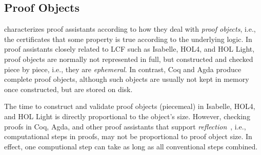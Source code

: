 
\subsection{Proof Objects}
\label{sec:proof-objects}

\citet{Barendregt2013} characterizes proof assistants according to how they deal with \emph{proof objects}, i.e., the certificates that some property is true according to the underlying logic. In proof assistants closely related to LCF such as Isabelle, HOL4, and HOL Light, proof objects are normally not represented in full, but constructed and checked piece by piece, i.e., they are \emph{ephemeral}. In contrast, Coq and Agda produce complete proof objects, although such objects are usually not kept in memory once constructed, but are stored on disk.

The time to construct and validate proof objects (piecemeal) in Isabelle, HOL4, and HOL Light is directly proportional to the object's size. However, checking proofs in Coq, Agda, and other proof assistants that support \emph{reflection}~\citep{Boutin1997}, i.e., computational steps in proofs, may not be proportional to proof object size. In effect, one computional step can take as long as all conventional steps combined.


